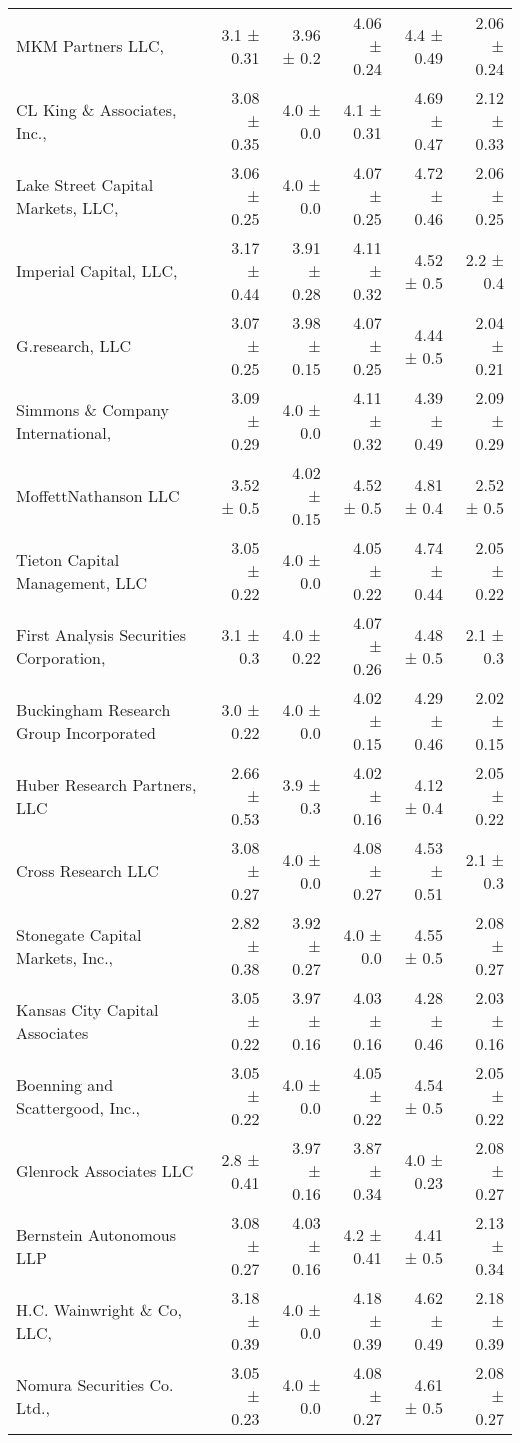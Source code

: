 \begin{tabular}{lrrrrr}
MKM Partners LLC,  & 3.1 ± 0.31 & 3.96 ± 0.2 & 4.06 ± 0.24 & 4.4 ± 0.49 & 2.06 ± 0.24 \\
CL King \& Associates, Inc.,  & 3.08 ± 0.35 & 4.0 ± 0.0 & 4.1 ± 0.31 & 4.69 ± 0.47 & 2.12 ± 0.33 \\
Lake Street Capital Markets, LLC,  & 3.06 ± 0.25 & 4.0 ± 0.0 & 4.07 ± 0.25 & 4.72 ± 0.46 & 2.06 ± 0.25 \\
Imperial Capital, LLC,  & 3.17 ± 0.44 & 3.91 ± 0.28 & 4.11 ± 0.32 & 4.52 ± 0.5 & 2.2 ± 0.4 \\
G.research, LLC & 3.07 ± 0.25 & 3.98 ± 0.15 & 4.07 ± 0.25 & 4.44 ± 0.5 & 2.04 ± 0.21 \\
Simmons \& Company International,  & 3.09 ± 0.29 & 4.0 ± 0.0 & 4.11 ± 0.32 & 4.39 ± 0.49 & 2.09 ± 0.29 \\
MoffettNathanson LLC & 3.52 ± 0.5 & 4.02 ± 0.15 & 4.52 ± 0.5 & 4.81 ± 0.4 & 2.52 ± 0.5 \\
Tieton Capital Management, LLC & 3.05 ± 0.22 & 4.0 ± 0.0 & 4.05 ± 0.22 & 4.74 ± 0.44 & 2.05 ± 0.22 \\
First Analysis Securities Corporation,  & 3.1 ± 0.3 & 4.0 ± 0.22 & 4.07 ± 0.26 & 4.48 ± 0.5 & 2.1 ± 0.3 \\
Buckingham Research Group Incorporated & 3.0 ± 0.22 & 4.0 ± 0.0 & 4.02 ± 0.15 & 4.29 ± 0.46 & 2.02 ± 0.15 \\
Huber Research Partners, LLC & 2.66 ± 0.53 & 3.9 ± 0.3 & 4.02 ± 0.16 & 4.12 ± 0.4 & 2.05 ± 0.22 \\
Cross Research LLC & 3.08 ± 0.27 & 4.0 ± 0.0 & 4.08 ± 0.27 & 4.53 ± 0.51 & 2.1 ± 0.3 \\
Stonegate Capital Markets, Inc.,  & 2.82 ± 0.38 & 3.92 ± 0.27 & 4.0 ± 0.0 & 4.55 ± 0.5 & 2.08 ± 0.27 \\
Kansas City Capital Associates & 3.05 ± 0.22 & 3.97 ± 0.16 & 4.03 ± 0.16 & 4.28 ± 0.46 & 2.03 ± 0.16 \\
Boenning and Scattergood, Inc.,  & 3.05 ± 0.22 & 4.0 ± 0.0 & 4.05 ± 0.22 & 4.54 ± 0.5 & 2.05 ± 0.22 \\
Glenrock Associates LLC & 2.8 ± 0.41 & 3.97 ± 0.16 & 3.87 ± 0.34 & 4.0 ± 0.23 & 2.08 ± 0.27 \\
Bernstein Autonomous LLP & 3.08 ± 0.27 & 4.03 ± 0.16 & 4.2 ± 0.41 & 4.41 ± 0.5 & 2.13 ± 0.34 \\
H.C. Wainwright \& Co, LLC,  & 3.18 ± 0.39 & 4.0 ± 0.0 & 4.18 ± 0.39 & 4.62 ± 0.49 & 2.18 ± 0.39 \\
Nomura Securities Co. Ltd.,  & 3.05 ± 0.23 & 4.0 ± 0.0 & 4.08 ± 0.27 & 4.61 ± 0.5 & 2.08 ± 0.27 \\

\end{tabular}
